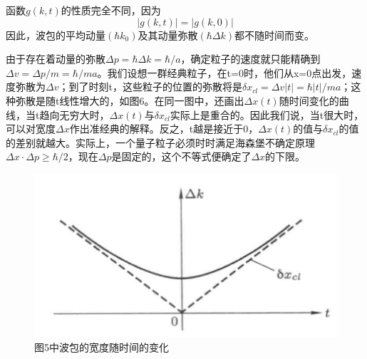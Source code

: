 \documentclass[]{article}
\begin{document}
函数$g(k,t)$的性质完全不同，因为
\begin{equation}
	|g(k,t)|=|g(k,0)|
\end{equation}
因此，波包的平均动量$(\hbar k_0)$及其动量弥散$(\hbar\Delta k)$都不随时间而变。\par 
由于存在着动量的弥散$\Delta p=\hbar\Delta k=\hbar/a$，确定粒子的速度就只能精确到$\Delta v=\Delta p/m=\hbar/ma$。我们设想一群经典粒子，在t=0时，他们从x=0点出发，速度弥散为$\Delta v$；到了时刻t，这些粒子的位置的弥散将是$\delta x_{cl}=\Delta v|t|=\hbar|t|/ma$；这种弥散是随t线性增大的，如图6。在同一图中，还画出$\Delta x(t)$随时间变化的曲线，当t趋向无穷大时，$\Delta x(t)$与$\delta x_{cl}$实际上是重合的。因此我们说，当t很大时，可以对宽度$\Delta x$作出准经典的解释。反之，t越是接近于0，$\Delta x(t)$的值与$\delta x_{cl}$的值的差别就越大。实际上，一个量子粒子必须时时满足海森堡不确定原理$\Delta x\cdot\Delta p\geqslant\hbar/2$，现在$\Delta p$是固定的，这个不等式便确定了$\Delta x$的下限。
\begin{figure}[H]
	\centering
	\includegraphics[scale=0.2]{6.png}
	\caption{图5中波包的宽度随时间的变化}
	\label{Figure 6}
\end{figure}
\end{document}
